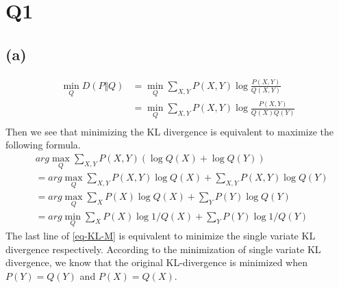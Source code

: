 \documentclass{article}
\begin{document}
\maketitle

\section*{Q1}
\subsection*{(a)}
\begin{equation}
    \begin{split}
        \min_{Q} D(P\Vert Q) &= \min_{Q}\sum_{X, Y} P(X, Y) \log\frac{P(X, Y)}{Q(X, Y)}\\
                    &= \min_{Q}\sum_{X, Y} P(X, Y) \log\frac{P(X, Y)}{Q(X)Q(Y)}\\
    \end{split}
\end{equation} 
Then we see that minimizing the KL divergence is equivalent to maximize the following formula.
\begin{equation} \label{eq-KL-M}
    \begin{split}
                    &arg\max_{Q}\sum_{X, Y} P(X, Y) (\log Q(X) + \log Q(Y))  \\
                    &= arg\max_{Q}\sum_{X, Y} P(X, Y) \log Q(X) + \sum_{X, Y} P(X, Y) \log Q(Y)\\
                    &= arg\max_{Q}\sum_{X} P(X) \log Q(X) + \sum_{Y} P(Y) \log Q(Y)\\
                    &= arg\min_{Q} \sum_{X} P(X) \log 1/Q(X) + \sum_{Y} P(Y) \log 1/Q(Y)
    \end{split}
\end{equation}
The last line of \eqref{eq-KL-M} is equivalent to minimize the single variate KL divergence respectively.
According to the minimization of single variate KL divergence, we know that the original KL-divergence is minimized when $P(Y) = Q(Y)$ and $P(X) = Q(X)$. 
\end{document}
